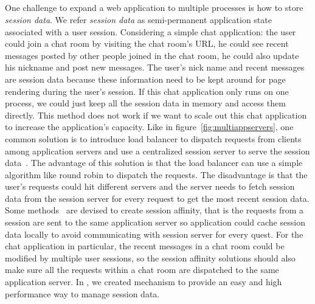 \subsection{\appins{}}
\label{sec:appins}
One challenge to expand a web application to multiple processes is
how to store \emph{session data}.
We refer \emph{session data} as semi-permanent
application state associated with a user session.
Considering a simple chat application:
the user could join a chat room by visiting the chat room's URL,
he could see recent messages posted by other people joined in the chat room,
he could also update his nickname and post new messages.
The user's nick name and recent messages are session data
because these information need to be kept around for page rendering
during the user's session.
If this chat application only runs on one process,
we could just keep all the session data in memory and access
them directly.
This method does not work
if we want to scale out this chat application to increase the application's capacity.
Like in figure~\ref{fig:multiappservers},
one common solution is to introduce load balancer to dispatch
requests from clients among application servers and
use a centralized session server to serve the session data~\cite{j2eedoc,chlan2002internet,chiang2001transparent,saigo2003session}.
The advantage of this solution is that the load balancer can use
a simple algorithm like round robin to dispatch the requests.
The disadvantage is that the user's requests could hit different
servers and the server needs to fetch session data from the session server
for every request to get the most recent session data.
Some methods~\cite{shachor2005maintaining} are devised to create session affinity,
that is the requests from a session are sent to the same application
server so application could cache session data locally to avoid communicating with
session server for every quest.
For the chat application in particular,
the recent messages in a chat room could be modified by multiple user sessions,
so the session affinity solutions should also make sure all the requests within
a chat room are dispatched to the same application server.
In \cb{}, we created \appins{} mechanism to provide an easy and high performance
way to manage session data.

\multiappservers{}

